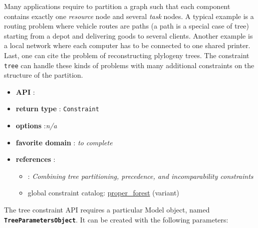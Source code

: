 Many applications require to partition a graph such that each component contains exactly one \emph{resource} node and several \emph{task} nodes. A typical example is a routing problem where vehicle routes are paths (a path is a special case of tree) starting from a depot and delivering goods to several clients. Another example is a local network where each computer has to be connected to one shared printer. Last, one can cite the problem of reconstructing plylogeny trees.
The constraint \texttt{tree} can handle these kinds of problems with many additional constraints on the structure of the partition.

\begin{itemize}
	\item \textbf{API} : 
	\item \textbf{return type} : \texttt{Constraint}
	\item \textbf{options} :\emph{n/a}
	\item \textbf{favorite domain} : \emph{to complete}
	\item \textbf{references} :
      \begin{itemize}
      \item \cite{beldiceanuCONSTRAINTS08}: \emph{Combining tree partitioning, precedence, and incomparability constraints}
      \item global constraint catalog: \href{http://www.emn.fr/x-info/sdemasse/gccat/Cproper_forest.html}{proper\_forest} (variant)
      \end{itemize}

\end{itemize}

The tree constraint API requires a particular Model object, named \textbf{\tt TreeParametersObject}.
It can be created with the following parameters:

